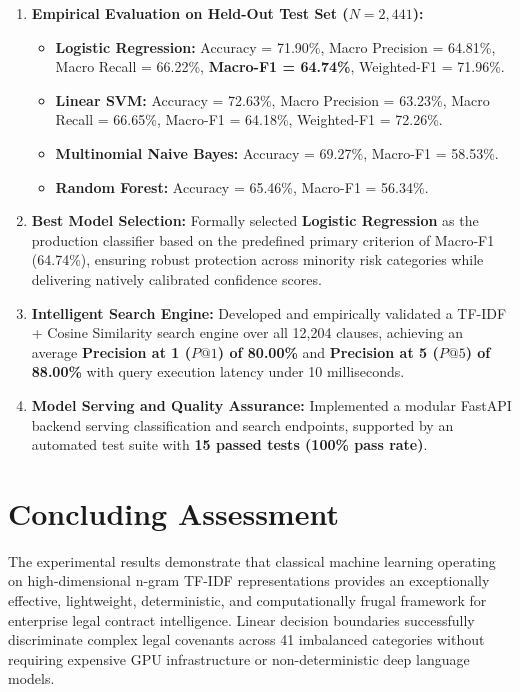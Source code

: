 \begin{enumerate}
\begin{itemize}
    \end{itemize}
    \item \textbf{Empirical Evaluation on Held-Out Test Set ($N = 2,441$):}
    \begin{itemize}
        \item \textbf{Logistic Regression:} Accuracy = 71.90\%, Macro Precision = 64.81\%, Macro Recall = 66.22\%, \textbf{Macro-F1 = 64.74\%}, Weighted-F1 = 71.96\%.
        \item \textbf{Linear SVM:} Accuracy = 72.63\%, Macro Precision = 63.23\%, Macro Recall = 66.65\%, Macro-F1 = 64.18\%, Weighted-F1 = 72.26\%.
        \item \textbf{Multinomial Naive Bayes:} Accuracy = 69.27\%, Macro-F1 = 58.53\%.
        \item \textbf{Random Forest:} Accuracy = 65.46\%, Macro-F1 = 56.34\%.
    \end{itemize}
    \item \textbf{Best Model Selection:} Formally selected \textbf{Logistic Regression} as the production classifier based on the predefined primary criterion of Macro-F1 (64.74\%), ensuring robust protection across minority risk categories while delivering natively calibrated confidence scores.
    \item \textbf{Intelligent Search Engine:} Developed and empirically validated a TF-IDF + Cosine Similarity search engine over all 12,204 clauses, achieving an average \textbf{Precision at 1 ($P@1$) of 80.00\%} and \textbf{Precision at 5 ($P@5$) of 88.00\%} with query execution latency under 10 milliseconds.
    \item \textbf{Model Serving and Quality Assurance:} Implemented a modular FastAPI backend serving classification and search endpoints, supported by an automated test suite with \textbf{15 passed tests (100\% pass rate)}.
\end{enumerate}

\section{Concluding Assessment}
\label{sec:concluding_assessment}
The experimental results demonstrate that classical machine learning operating on high-dimensional n-gram TF-IDF representations provides an exceptionally effective, lightweight, deterministic, and computationally frugal framework for enterprise legal contract intelligence. Linear decision boundaries successfully discriminate complex legal covenants across 41 imbalanced categories without requiring expensive GPU infrastructure or non-deterministic deep language models.
